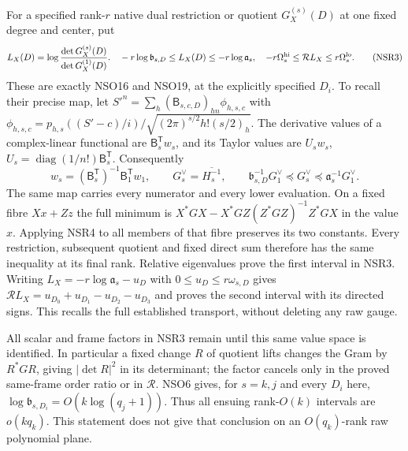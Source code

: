 \documentclass[11pt,a4paper]{article}
\begin{document}
For a specified rank-$r$ native dual restriction or quotient
$G_X^{(s)}(D)$ at one fixed degree and center, put
\[
 L_X(D)=\log\frac{\det G_X^{(s)}(D)}{\det G_X^{(1)}(D)}.
 \quad
 -r\log\mathfrak b_{s,D}\le L_X(D)\le-r\log\mathfrak a_s,
 \quad
 -r\Omega_s^{\rm hi}\le\mathcal RL_X\le r\Omega_s^{\rm lo}.
 \tag{NSR3}
\]
These are exactly NSO16 and NSO19, at the explicitly specified
$D_i$. To recall their precise map, let
$S'^n=\sum_h(\mathsf B_{s,c,D})_{hn}\phi_{h,s,c}$ with
$\phi_{h,s,c}=p_{h,s}((S'-c)/i)/\sqrt{(2\pi)^{s/2}h!(s/2)_h}$.
The derivative values of a complex-linear functional are
$\mathsf B_s^{\mathsf T}w_s$, and its Taylor values are
$U_sw_s$, $U_s=\operatorname{diag}(1/n!)\mathsf B_s^{\mathsf T}$.
Consequently
\[
 w_s=(\mathsf B_s^{\mathsf T})^{-1}\mathsf B_1^{\mathsf T}w_1,
 \qquad
 G^\vee_s=\overline{H_s^{-1}},\qquad
 \mathfrak b_{s,D}^{-1}G^\vee_1
       \preceq G^\vee_s\preceq\mathfrak a_s^{-1}G^\vee_1 .
 \tag{NSR4}
\]
The same map carries every numerator and every lower evaluation.
On a fixed fibre $Xx+Zz$ the full minimum is
$X^*GX-X^*GZ(Z^*GZ)^{-1}Z^*GX$ in the value $x$.
Applying NSR4 to all members of that fibre preserves its two
constants. Every restriction, subsequent quotient and fixed
direct sum therefore has the same inequality at its final rank.
Relative eigenvalues prove the first interval in NSR3.
Writing $L_X=-r\log\mathfrak a_s-u_D$ with
$0\le u_D\le r\omega_{s,D}$ gives
$\mathcal RL_X=u_{D_0}+u_{D_1}-u_{D_2}-u_{D_3}$ and proves
the second interval with its directed signs. This recalls
the full established transport, without deleting any raw gauge.

All scalar and frame factors in NSR3 remain until this same
value space is identified. In particular a fixed change $R$
of quotient lifts changes the Gram by $R^*GR$, giving
$|\det R|^2$ in its determinant; the factor cancels only in
the proved same-frame order ratio or in $\mathcal R$.
NSO6 gives, for $s=k,j$ and every $D_i$ here,
$\log\mathfrak b_{s,D_i}=O(k\log(q_j+1))$.
Thus all ensuing rank-$O(k)$ intervals are $o(kq_k)$.
This statement does not give that conclusion on an
$O(q_k)$-rank raw polynomial plane.
\end{document}

